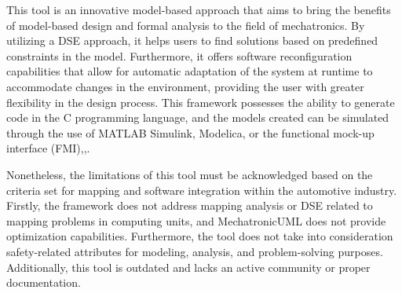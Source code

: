 This tool is an innovative model-based approach that aims to bring the benefits of model-based design and formal analysis to the field of mechatronics. By utilizing a DSE approach, it helps users to find solutions based on predefined constraints in the model. Furthermore, it offers software reconfiguration capabilities that allow for automatic adaptation of the system at runtime to accommodate changes in the environment, providing the user with greater flexibility in the design process.
This framework possesses the ability to generate code in the C programming language, and the models created can be simulated through the use of MATLAB Simulink, Modelica, or the functional mock-up interface (FMI)\cite{fritzson1998modelica},\cite{MATLAB:2010},\cite{schafer2010model}.

Nonetheless, the limitations of this tool must be acknowledged based on the criteria set for mapping and software integration within the automotive industry. Firstly, the framework does not address mapping analysis or DSE related to mapping problems in computing units, and MechatronicUML does not provide optimization capabilities. Furthermore, the tool does not take into consideration safety-related attributes for modeling, analysis, and problem-solving purposes. Additionally, this tool is outdated and lacks an active community or proper documentation.

